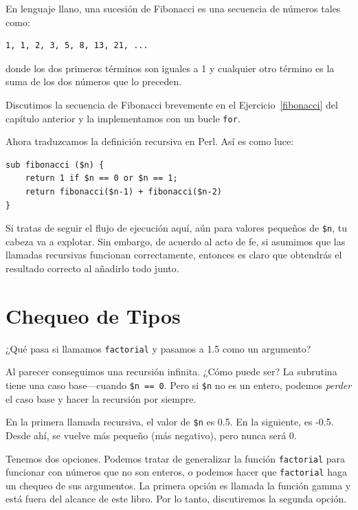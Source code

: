 En lenguaje llano, una sucesión de Fibonacci es una secuencia de
números tales como:
\begin{verbatim}
1, 1, 2, 3, 5, 8, 13, 21, ...
\end{verbatim}
donde los dos primeros términos son iguales a 1 y cualquier otro
término es la suma de los dos números que lo preceden.

Discutimos la secuencia de Fibonacci brevemente en el Ejercicio~\ref{fibonacci}
del capítulo anterior y la implementamos con un bucle {\tt for}.

Ahora traduzcamos la definición recursiva en Perl. Así es como luce:

\begin{verbatim}
sub fibonacci ($n) {
    return 1 if $n == 0 or $n == 1;
    return fibonacci($n-1) + fibonacci($n-2)
}
\end{verbatim}
%
Si tratas de seguir el flujo de ejecución aquí, aún para valores
pequeños de \verb|$n|, tu cabeza va a explotar. Sin embargo, de acuerdo
al acto de fe, si asumimos que las llamadas recursivas funcionan correctamente,
entonces es claro que obtendrás el resultado correcto al añadirlo todo 
junto.


\section{Chequeo de Tipos}
\label{guardian}

¿Qué pasa si llamamos {\tt factorial} y pasamos a 1.5 como un argumento?

Al parecer conseguimos una recursión infinita. ¿Cómo puede ser?
La subrutina tiene una caso base---cuando {\tt \$n == 0}. Pero 
si {\tt \$n} no es un entero, podemos {\em perder} el caso base 
y hacer la recursión por siempre. 

En la primera llamada recursiva, el valor de {\tt \$n} es 0.5.
En la siguiente, es -0.5. Desde ahí, se vuelve más pequeño 
(más negativo), pero nunca será 0.

Tenemos dos opciones. Podemos tratar de generalizar la función
{\tt factorial} para funcionar con números que no son enteros, o
podemos hacer que {\tt factorial} haga un chequeo de sus argumentos.
La primera opción es llamada la función gamma y está fuera del alcance 
de este libro. Por lo tanto, discutiremos la segunda opción.

